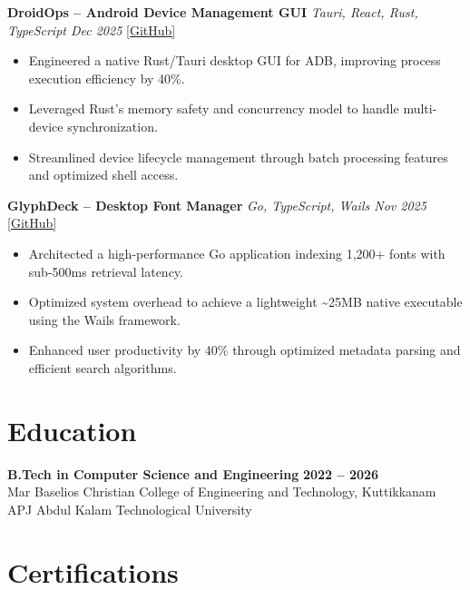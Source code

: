 \documentclass[a4paper,10pt]{article}
\begin{document}
\vspace{4pt}

\textbf{DroidOps -- Android Device Management GUI} \hfill \textit{Tauri, React, Rust, TypeScript \quad Dec 2025} \quad \href{https://github.com/your-github/droidops}{[GitHub]}
\begin{itemize}
\item Engineered a native Rust/Tauri desktop GUI for ADB, improving process execution efficiency by 40\%.
\item Leveraged Rust's memory safety and concurrency model to handle multi-device synchronization.
\item Streamlined device lifecycle management through batch processing features and optimized shell access.
\end{itemize}

\vspace{4pt}

\textbf{GlyphDeck -- Desktop Font Manager} \hfill \textit{Go, TypeScript, Wails \quad Nov 2025} \quad \href{https://github.com/your-github/GlyphDeck}{[GitHub]}
\begin{itemize}
\item Architected a high-performance Go application indexing 1,200+ fonts with sub-500ms retrieval latency.
\item Optimized system overhead to achieve a lightweight \textasciitilde25MB native executable using the Wails framework.
\item Enhanced user productivity by 40\% through optimized metadata parsing and efficient search algorithms.
\end{itemize}

\section*{Education}

\textbf{B.Tech in Computer Science and Engineering} \hfill \textbf{2022 -- 2026}\\
Mar Baselios Christian College of Engineering and Technology, Kuttikkanam \hfill APJ Abdul Kalam Technological University

\section*{Certifications}
\end{document}
